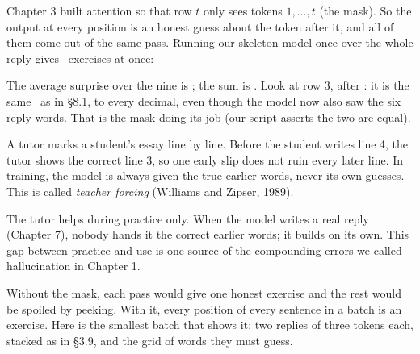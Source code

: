 Chapter 3 built attention so that row $t$ only sees tokens $1,\ldots,t$ (the mask). So the output at every
position is an honest guess about the token after it, and all of them come out of the same pass. Running our
skeleton model once over the whole reply gives \nEightNumEx\ exercises at once:

\par\medskip\noindent\begin{minipage}{\linewidth}\centering
\fitR{}
\end{minipage}\par\medskip

The average surprise over the nine is \nEightMeanLoss; the sum is \nEightSumLoss. Look at row 3, after
: it is the
same \nEightLossZero\ as in \S8.1, to every decimal, even though the model now also saw the six reply words.
That is the mask doing its job (our script asserts the two are equal).

\Picture A tutor marks a student's essay line by line. Before the student writes line 4, the tutor shows the
correct line 3, so one early slip does not ruin every later line. In training, the model is always given the
true earlier words, never its own guesses. This is called \emph{teacher forcing} (Williams and Zipser, 1989).

\begin{breaks}
The tutor helps during practice only. When the model writes a real reply (Chapter 7), nobody hands it the
correct earlier words; it builds on its own. This gap between practice and use is one source of the
compounding errors we called hallucination in Chapter 1.
\end{breaks}

\Why Without the mask, each pass would give one honest exercise and the rest would be spoiled by peeking.
With it, every position of every sentence in a batch is an exercise. Here is the smallest batch that
shows it: two replies of three tokens each, stacked as in \S3.9, and the grid of words they must guess.

\par\medskip\noindent\begin{minipage}{\linewidth}\centering
\fitR{}
\end{minipage}\par\medskip

